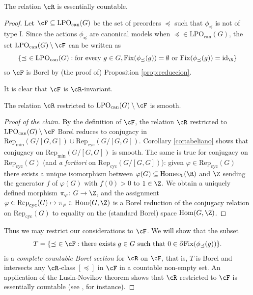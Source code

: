 \documentclass[reqno]{amsart}
\begin{document}
\begin{prop} \label{prop:Rcountable}
The relation $\cR$ is essentially countable.
\end{prop}
\begin{proof}
Let $\cF \subseteq \mathrm{LPO}_\mathrm{can}(G)$ be the set of preorders $\preceq$ such that $\phi_\preceq$ is not of type I. Since the actions $\phi_\preceq$ are canonical models when $\preceq \in \mathrm{LPO}_\mathrm{can}(G)$, the set $\mathrm{LPO}_\mathrm{can}(G) \setminus \cF$ can be written as
\[
	\{ \preceq \ \in \mathrm{LPO}_\mathrm{can}(G) : \text{for every }g \in G, \mathrm{Fix}(\phi_\preceq(g)) = \emptyset \text{ or } \mathrm{Fix}(\phi_\preceq(g)) = \mathrm{id}_\R\}
\]
so $\cF$ is Borel by (the proof of) Proposition \ref{prop:reduccion}. 

It is clear that $\cF$ is $\cR$-invariant.

\begin{claim}
The relation $\cR$ restricted to $\mathrm{LPO}_\mathrm{can}(G) \setminus \cF$ is smooth.
\end{claim}
\begin{proof}[Proof of the claim]
By the definition of $\cF$, the relation $\cR$ restricted to $\mathrm{LPO}_\mathrm{can}(G) \setminus \cF$ Borel reduces to conjugacy in $\mathrm{Rep}_\mathrm{min}(G/[G,G]) \cup \mathrm{Rep}_\mathrm{cyc}(G/[G,G])$. Corollary \ref{cor:abeliano} shows that conjugacy on $\mathrm{Rep}_\mathrm{min}(G/[G,G])$ is smooth. The same is true for conjugacy on $\mathrm{Rep}_\mathrm{cyc}(G)$ (and \emph{a fortiori} on $\mathrm{Rep}_\mathrm{cyc}(G/[G,G])$): given $\varphi \in \mathrm{Rep}_\mathrm{cyc}(G)$ there exists a unique isomorphism between $\varphi(G) \subseteq \mathrm{Homeo}_0(\R)$ and $\Z$ sending the generator $f$ of $\varphi(G)$ with $f(0)> 0$ to $1 \in \Z$. We obtain a uniquely defined morphism $\pi_\varphi \colon G \to \Z$, and the assignment $\varphi \in \mathrm{Rep}_\mathrm{cyc}(G) \mapsto \pi_\varphi \in \mathrm{Hom}(G, \Z)$ is a Borel reduction of the conjugacy relation on $\mathrm{Rep}_\mathrm{cyc}(G)$ to equality on the (standard Borel) space $\mathrm{Hom}(G, \Z)$.
\end{proof}

Thus we may restrict our considerations to $\cF$. We will show that the subset
\[
	T = \{\preceq \ \in \cF : \text{there exists }g \in G \text{ such that }0 \in \partial \mathrm{Fix}(\phi_\preceq(g))\}.
\]
is a \emph{complete countable Borel section} for $\cR$ on $\cF$, that is, $T$ is Borel and intersects any $\cR$-class $[\preceq]$ in $\cF$ in a countable non-empty set. An application of the Lusin-Novikov theorem shows that $\cR$ restricted to $\cF$ is essentially countable (see \cite[Corollary 7.5.3]{Gao2009}, for instance).


\end{proof}
\end{document}
